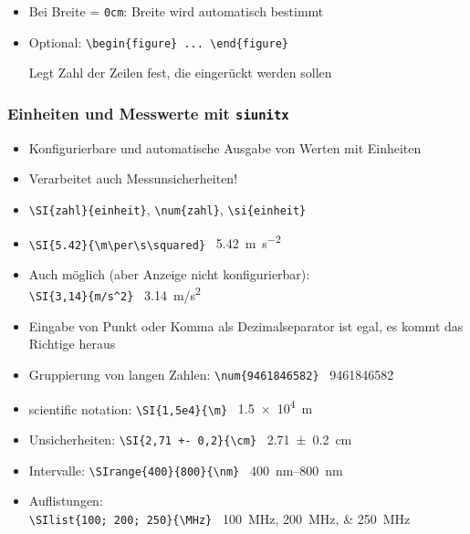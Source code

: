 \begin{frame}[<+->][fragile]
\begin{itemize}
\begin{columns}
		\end{columns}
		\item Bei Breite = \texttt{0cm}: Breite wird automatisch bestimmt
		\item Optional: \lstinline!\begin{figure} ... \end{figure}!
		
		Legt Zahl der Zeilen fest, die eingerückt werden sollen
	\end{itemize}
\end{frame}

\begin{frame}[<+->][fragile]
	\frametitle{Einheiten und Messwerte mit \texttt{siunitx}}
	\begin{itemize}
		\item Konfigurierbare und automatische Ausgabe von Werten mit Einheiten
		\item Verarbeitet auch Messunsicherheiten!
		\item \lstinline!\SI{zahl}{einheit}!, \lstinline!\num{zahl}!, \lstinline!\si{einheit}!
		\item \lstinline!\SI{5.42}{\m\per\s\squared}!
		\textrightarrow\ {\rmfamily\SI{5.42}{\m\per\s\squared}}
		\DeactivateWarningFilters
		\item Auch möglich (aber Anzeige nicht konfigurierbar):\\
		\lstinline!\SI{3,14}{m/s^2}! \textrightarrow\ {\rmfamily\SI{3,14}{m/s^2}}
		\item Eingabe von Punkt oder Komma als Dezimalseparator ist egal, es kommt das Richtige heraus
		\item Gruppierung von langen Zahlen: \lstinline!\num{9461846582}! \textrightarrow\ {\rmfamily\num{9461846582}}
		\item scientific notation: \lstinline!\SI{1,5e4}{\m}! \textrightarrow\ {\rmfamily\SI{1,5e4}{\m}}
		\item Unsicherheiten: \lstinline!\SI{2,71 +- 0,2}{\cm}! \textrightarrow\ {\rmfamily\SI{2,71 +- 0,2}{\cm}}
		\item Intervalle: \lstinline!\SIrange{400}{800}{\nm}! \textrightarrow\ {\rmfamily\SIrange{400}{800}{\nm}}
		\item Auflistungen:\\
		\lstinline!\SIlist{100; 200; 250}{\MHz}! \textrightarrow\ {\rmfamily\SIlist{100; 200; 250}{\MHz}}
	\end{itemize}
\end{frame}

